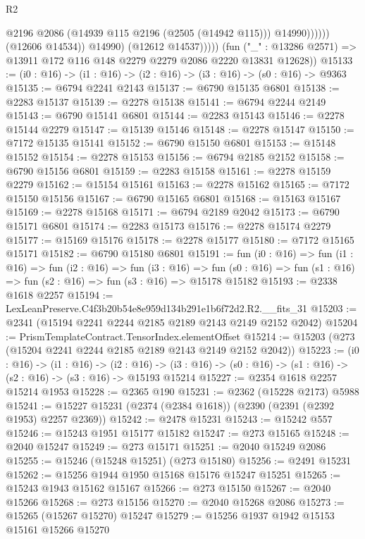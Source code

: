 \begin{lexlean}{R2}
\begin{coremodule}
                              @2196
                              @2086
                              (@14939 @115 @2196 (@2505 (@14942 @115)))
                              @14990))))))
                  (@12606 @14534))
                @14990)
              (@12612 @14537)))))
      (fun ("_" : @13286 @2571) => @13911 @172 @116 @148 @2279 @2279 @2086 @2220 @13831 @12628))
@15133 := (i0 : @16) -> (i1 : @16) -> (i2 : @16) -> (i3 : @16) -> (s0 : @16) -> @9363
@15135 := @6794 @2241 @2143
@15137 := @6790 @15135 @6801
@15138 := @2283 @15137
@15139 := @2278 @15138
@15141 := @6794 @2244 @2149
@15143 := @6790 @15141 @6801
@15144 := @2283 @15143
@15146 := @2278 @15144 @2279
@15147 := @15139 @15146
@15148 := @2278 @15147
@15150 := @7172 @15135 @15141
@15152 := @6790 @15150 @6801
@15153 := @15148 @15152
@15154 := @2278 @15153
@15156 := @6794 @2185 @2152
@15158 := @6790 @15156 @6801
@15159 := @2283 @15158
@15161 := @2278 @15159 @2279
@15162 := @15154 @15161
@15163 := @2278 @15162
@15165 := @7172 @15150 @15156
@15167 := @6790 @15165 @6801
@15168 := @15163 @15167
@15169 := @2278 @15168
@15171 := @6794 @2189 @2042
@15173 := @6790 @15171 @6801
@15174 := @2283 @15173
@15176 := @2278 @15174 @2279
@15177 := @15169 @15176
@15178 := @2278 @15177
@15180 := @7172 @15165 @15171
@15182 := @6790 @15180 @6801
@15191 := fun (i0 : @16) =>
  fun (i1 : @16) =>
  fun (i2 : @16) =>
  fun (i3 : @16) =>
  fun (s0 : @16) => fun (s1 : @16) => fun (s2 : @16) => fun (s3 : @16) => @15178 @15182
@15193 := @2338 @1618 @2257
@15194 := LexLeanPreserve.C4f3b20b54e8e959d134b291e1b6f72d2.R2.__fits_31
@15203 := @2341 (@15194 @2241 @2244 @2185 @2189 @2143 @2149 @2152 @2042)
@15204 := PrismTemplateContract.TensorIndex.elementOffset
@15214 := @15203 (@273 (@15204 @2241 @2244 @2185 @2189 @2143 @2149 @2152 @2042))
@15223 := (i0 : @16) ->
  (i1 : @16) ->
  (i2 : @16) -> (i3 : @16) -> (s0 : @16) -> (s1 : @16) -> (s2 : @16) -> (s3 : @16) -> @15193 @15214
@15227 := @2354 @1618 @2257 @15214 @1953
@15228 := @2365 @190
@15231 := @2362 (@15228 @2173) @5988
@15241 := @15227 @15231 (@2374 (@2384 @1618)) (@2390 (@2391 (@2392 @1953) @2257 @2369))
@15242 := @2478 @15231
@15243 := @15242 @557
@15246 := @15243 @1951 @15177 @15182
@15247 := @273 @15165
@15248 := @2040 @15247
@15249 := @273 @15171
@15251 := @2040 @15249 @2086
@15255 := @15246 (@15248 @15251) (@273 @15180)
@15256 := @2491 @15231
@15262 := @15256 @1944 @1950 @15168 @15176 @15247 @15251
@15265 := @15243 @1943 @15162 @15167
@15266 := @273 @15150
@15267 := @2040 @15266
@15268 := @273 @15156
@15270 := @2040 @15268 @2086
@15273 := @15265 (@15267 @15270) @15247
@15279 := @15256 @1937 @1942 @15153 @15161 @15266 @15270

\end{coremodule}
\end{lexlean}

